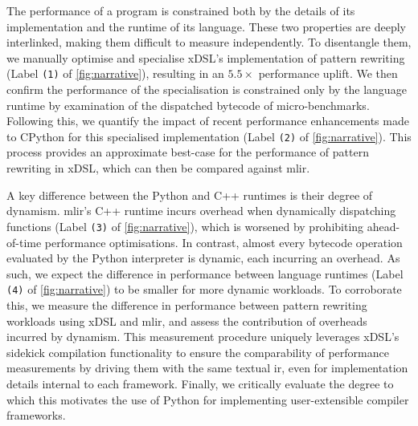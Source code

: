 The performance of a program is constrained both by the details of its implementation and the runtime of its language.
These two properties are deeply interlinked, making them difficult to measure independently.
To disentangle them, we manually optimise and specialise xDSL's implementation of pattern rewriting (Label \texttt{(1)} of \autoref{fig:narrative}), resulting in an $5.5\times$ performance uplift. %
We then confirm the performance of the specialisation is constrained only by the language runtime by examination of the dispatched bytecode of micro-benchmarks.
Following this, we quantify the impact of recent performance enhancements made to CPython for this specialised implementation (Label \texttt{(2)} of \autoref{fig:narrative}). %
This process provides an approximate best-case for the performance of pattern rewriting in xDSL, which can then be compared against \ac{mlir}.




A key difference between the Python and C++ runtimes is their degree of dynamism.
\ac{mlir}'s C++ runtime incurs overhead when dynamically dispatching functions (Label \texttt{(3)} of \autoref{fig:narrative}), which is worsened by prohibiting ahead-of-time performance optimisations. In contrast, almost every bytecode operation evaluated by the Python interpreter is dynamic, each incurring an overhead.
As such, we expect the difference in performance between language runtimes (Label \texttt{(4)} of \autoref{fig:narrative}) to be smaller for more dynamic workloads.
To corroborate this, we measure the difference in performance between pattern rewriting workloads using xDSL and \ac{mlir}, and assess the contribution of overheads incurred by dynamism.
This measurement procedure uniquely leverages xDSL's sidekick compilation functionality to ensure the comparability of performance measurements by driving them with the same textual \ac{ir}, even for implementation details internal to each framework.
Finally, we critically evaluate the degree to which this motivates the use of Python for implementing user-extensible compiler frameworks.



